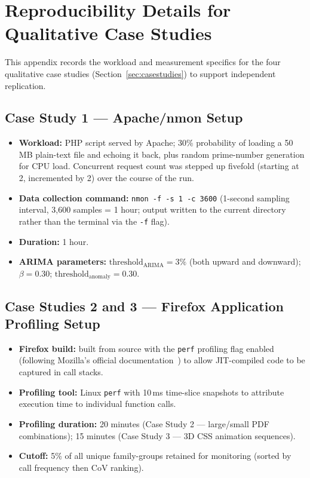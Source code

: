 \documentclass[a4paper,fleqn]{cas-sc}
\theoremstyle{plain}
\begin{document}
\appendix

\section{Reproducibility Details for Qualitative Case Studies}\label{app:reproducibility}

This appendix records the workload and measurement specifics for the four
qualitative case studies (Section~\ref{sec:casestudies}) to support
independent replication.

\subsection*{Case Study 1 --- Apache/nmon Setup}
\begin{itemize}
  \item \textbf{Workload:} PHP script served by Apache; 30\% probability of
    loading a 50\,MB plain-text file and echoing it back, plus random
    prime-number generation for CPU load.
    Concurrent request count was stepped up fivefold (starting at 2,
    incremented by 2) over the course of the run.
  \item \textbf{Data collection command:} \verb|nmon -f -s 1 -c 3600|
    (1-second sampling interval, 3{,}600 samples = 1 hour; output written
    to the current directory rather than the terminal via the \texttt{-f} flag).
  \item \textbf{Duration:} 1 hour.
  \item \textbf{ARIMA parameters:} $\text{threshold}_{\text{ARIMA}} = 3\%$
    (both upward and downward); $\beta = 0.30$;
    $\text{threshold}_{\text{anomaly}} = 0.30$.
\end{itemize}

\subsection*{Case Studies 2 and 3 --- Firefox Application Profiling Setup}
\begin{itemize}
  \item \textbf{Firefox build:} built from source with the \texttt{perf}
    profiling flag enabled (following Mozilla's official documentation~\cite{firefoxdocumentation})
    to allow JIT-compiled code to be captured in call stacks.
  \item \textbf{Profiling tool:} Linux \texttt{perf} with 10\,ms time-slice
    snapshots to attribute execution time to individual function calls.
  \item \textbf{Profiling duration:} 20 minutes (Case Study 2 --- large/small
    PDF combinations); 15 minutes (Case Study 3 --- 3D CSS animation sequences).
  \item \textbf{Cutoff:} 5\% of all unique family-groups retained for monitoring
    (sorted by call frequency then CoV ranking).
\end{itemize}
\end{document}
